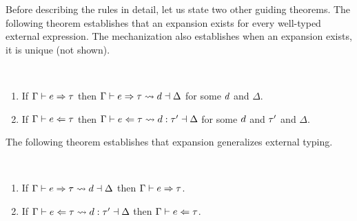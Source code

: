 Before describing the rules in detail, let us state two other guiding theorems. 
The following theorem establishes that an expansion exists for every well-typed external expression. 
The mechanization also establishes when an expansion exists, it is unique (not shown).
 \begin{thm}[Expandability] \label{thm:expandability}~
  \begin{enumerate}[nolistsep]
    \item
      If $\Gamma \vdash e \Rightarrow \tau$
      then $\Gamma \vdash e \Rightarrow \tau \leadsto d \dashv \Delta$
      for some $d$ and $\Delta$.
    \item
      If $\Gamma \vdash e \Leftarrow \tau$
      then $\Gamma \vdash e \Leftarrow \tau \leadsto d : \tau' \dashv \Delta$
      for some $d$ and $\tau'$ and $\Delta$.
  \end{enumerate}
\end{thm}
The following theorem establishes that expansion generalizes external typing.
\begin{thm} \label{thm:expansion-generality}~
  \begin{enumerate}[nolistsep]
    \item
      If $\Gamma \vdash e \Rightarrow \tau \leadsto d \dashv \Delta$
      then $\Gamma \vdash e \Rightarrow \tau$.
    \item
      If $\Gamma \vdash e \Leftarrow \tau \leadsto d : \tau' \dashv \Delta$
      then $\Gamma \vdash e \Leftarrow \tau$.
  \end{enumerate}
\end{thm}

